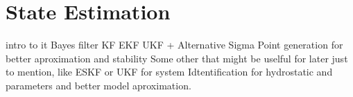 \section{State Estimation}

intro to it
Bayes filter
KF
EKF
UKF + Alternative Sigma Point generation for better aproximation and stability
Some other that might be uselful for later just to mention, like ESKF or UKF for system Idtentification for hydrostatic and parameters and better model aproximation.